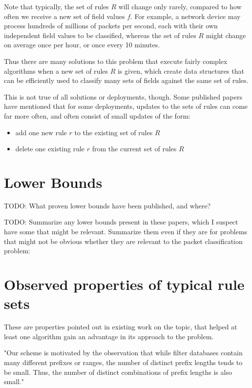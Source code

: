 \documentclass[acmsmall]{acmart}
\newcommand{\todo}[1]{}
\renewcommand{\todo}[1]{{\color{red} TODO: {#1}}}
\begin{document}
Note that typically, the set of rules $R$ will change only rarely,
compared to how often we receive a new set of field values $f$.
For example, a network device may process hundreds of millions of
packets per second, each with their own independent field values to be
classified, whereas the set of rules $R$ might change on average once
per hour, or once every 10 minutes.

Thus there are many solutions to this problem that execute fairly
complex algorithms when a new set of rules $R$ is given, which create
data structures that can be efficiently used to classify many
sets of fields against the same set of rules.

This is not true of all solutions or deployments, though.  Some
published papers have mentioned that for some deployments, updates to
the sets of rules can come far more often, and often consist of small
updates of the form:

\begin{itemize}
\item add one new rule $r$ to the existing set of rules $R$
\item delete one existing rule $r$ from the current set of rules $R$
\end{itemize}


\section{Lower Bounds}

\todo{What proven lower bounds have been published, and where?}

\todo{Summarize any lower bounds present in these papers, which I suspect have some that might be relevant.  Summarize them even if they are for problems that might not be obvious whether they are relevant to the packet classification problem:
~\cite{Fred1981}
~\cite{Chaz1990a}
~\cite{Chaz1990b}
}


\section{Observed properties of typical rule sets}

These are properties pointed out in existing work on the topic,
that helped at least one algorithm gain an advantage
in its approach to the problem.

"Our scheme is motivated by the observation that while filter databases
contain many different prefixes or ranges,
the number of distinct prefix lengths tends to be small.
Thus, the number of distinct combinations of prefix lengths is also small."~\cite[Sec. 5]{SSV1999}
\end{document}
